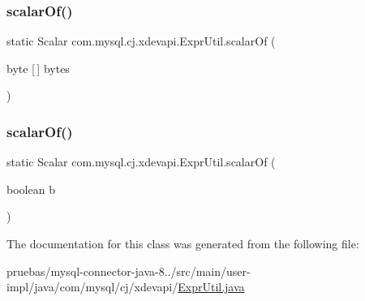 \subsubsection{\texorpdfstring{scalar\+Of()}{scalarOf()}\hspace{0.1cm}{\footnotesize\ttfamily [4/5]}}
{\footnotesize\ttfamily static Scalar com.\+mysql.\+cj.\+xdevapi.\+Expr\+Util.\+scalar\+Of (\begin{DoxyParamCaption}\item[{byte \mbox{[}$\,$\mbox{]}}]{bytes }\end{DoxyParamCaption})\hspace{0.3cm}{\ttfamily [static]}}

\mbox{\label{classcom_1_1mysql_1_1cj_1_1xdevapi_1_1_expr_util_af1782a40f28bd94a760758849f1aeb69}} 
\subsubsection{\texorpdfstring{scalar\+Of()}{scalarOf()}\hspace{0.1cm}{\footnotesize\ttfamily [5/5]}}
{\footnotesize\ttfamily static Scalar com.\+mysql.\+cj.\+xdevapi.\+Expr\+Util.\+scalar\+Of (\begin{DoxyParamCaption}\item[{boolean}]{b }\end{DoxyParamCaption})\hspace{0.3cm}{\ttfamily [static]}}



The documentation for this class was generated from the following file\+:\begin{DoxyCompactItemize}
\item 
pruebas/mysql-\/connector-\/java-\/8../src/main/user-\/impl/java/com/mysql/cj/xdevapi/\mbox{\hyperlink{_expr_util_8java}{Expr\+Util.\+java}}\end{DoxyCompactItemize}
